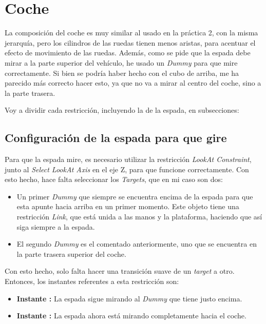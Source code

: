 \section{Coche}

La composición del coche es muy similar al usado en la práctica 2, con la misma jerarquía, pero los cilindros de las ruedas tienen menos aristas, para acentuar el efecto de movimiento de las ruedas. Además, como se pide que la espada debe mirar a la parte superior del vehículo, he usado un \textit{Dummy} para que mire correctamente. Si bien se podría haber hecho con el cubo de arriba, me ha parecido más correcto hacer esto, ya que no va a mirar al centro del coche, sino a la parte trasera.

\bigskip

Voy a dividir cada restricción, incluyendo la de la espada, en subsecciones:


\subsection{Configuración de la espada para que gire}

Para que la espada mire, es necesario utilizar la restricción \textit{LookAt Constraint}, junto al \textit{Select LookAt Axis} en el eje Z, para que funcione correctamente. Con esto hecho, hace falta seleccionar los \textit{Targets}, que en mi caso son dos:

\begin{itemize}
    \item Un primer \textit{Dummy} que siempre se encuentra encima de la espada para que esta apunte hacia arriba en un primer momento. Este objeto tiene una restricción \textit{Link}, que está unida a las manos y la plataforma, haciendo que así siga siempre a la espada.
    \item El segundo \textit{Dummy} es el comentado anteriormente, uno que se encuentra en la parte trasera superior del coche.
\end{itemize}

Con esto hecho, solo falta hacer una transición suave de un \textit{target} a otro. Entonces, los instantes referentes a esta restricción son:

\begin{itemize}
    \item \textbf{Instante : }La espada sigue mirando al \textit{Dummy} que tiene justo encima.
    \item \textbf{Instante : }La espada ahora está mirando completamente hacia el coche.
\end{itemize}

